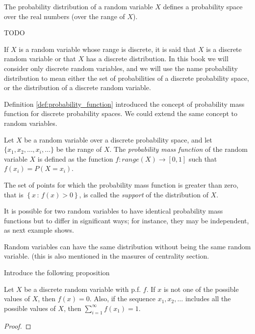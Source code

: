The probability distribution of a random variable $X$ defines a probability space over the real numbers (over the range of $X$). 

\begin{example}
{\color{red} TODO }
\end{example}

If $X$ is a random variable whose range is discrete, it is said that $X$ is a discrete random variable or that $X$ has a discrete distribution. In this book we will consider only discrete random variables, and we will use the name probability distribution to mean either the set of probabilities of a discrete probability space, or the distribution of a discrete random variable.

Definition \ref{def:probability_function} introduced the concept of probability mass function for discrete probability spaces. We could extend the same concept to random variables.

\begin{definition}
Let $X$ be a random variable over a discrete probability space, and let $\{ x_1, x_2, \ldots, x_i, \ldots \}$ be the range of $X$. The \emph{probability mass function} of the random variable $X$ is defined as the function $f : range \left( X \right) \rightarrow [0, 1]$ such that $f \left( x_i \right) = P \left( X = x_i \right)$.
\end{definition}

The set of points for which the probability mass function is greater than zero, that is $\left\{ x \, : \, f \left( x \right) > 0 \right\}$, is called the \emph{support} of the distribution of $X$.

It is possible for two random variables to have identical probability mass functions but to differ in significant ways; for instance, they may be independent, as next example shows.

\begin{example}
{\color{red} Random variables can have the same distribution without being the same random variable. (this is also mentioned in the masures of centrality section}.
\end{example}


{\color{red} Introduce the following proposition}

\begin{proposition}
Let $X$ be a discrete random variable with p.f. $f$. If $x$ is not one of the possible values of $X$, then $f\left(x\right)=0$. Also, if the sequence $x_{1},x_{2},\ldots$ includes all the possible values of $X$, then $\sum_{i=1}^{\infty}f\left(x_{1}\right)=1$.
\end{proposition}
\begin{proof}
\end{proof}

